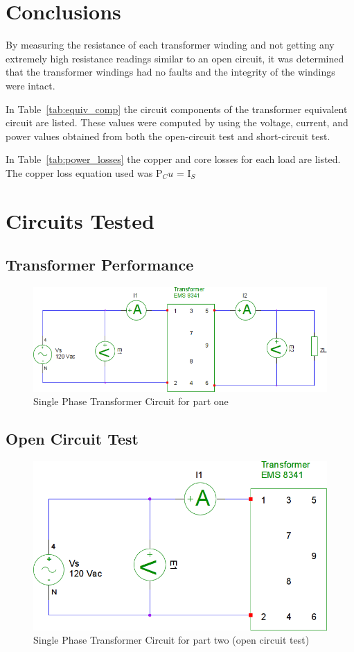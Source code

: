 \documentclass{article}
\begin{document}
\section{Conclusions}

By measuring the resistance of each transformer winding and not getting any
extremely high resistance readings similar to an open circuit, it was
determined that the transformer windings had no faults and the integrity of the
windings were intact.

In Table~\ref{tab:equiv_comp} the circuit components of the transformer equivalent circuit are listed. These
values were computed by using the voltage, current, and power values obtained from both the open-circuit
test and short-circuit test. 

In Table~\ref{tab:power_losses} the copper and core losses for each load are listed. The copper loss equation
used was P$_Cu$ = I$_S$


\pagebreak
\section*{Circuits Tested}
\subsection*{Transformer Performance}
\begin{figure}[H]
  \centering
  \includegraphics[width=.8\textwidth]{img/circuit_01}
  \caption{Single Phase Transformer Circuit for part one}
  \label{fig:circuit_01}
\end{figure}

\subsection*{Open Circuit Test}
\begin{figure}[H]
  \centering
  \includegraphics[width=.8\textwidth]{img/circuit_02}
  \caption{Single Phase Transformer Circuit for part two (open circuit test)}
  \label{fig:circuit_02}
\end{figure}
\end{document}
